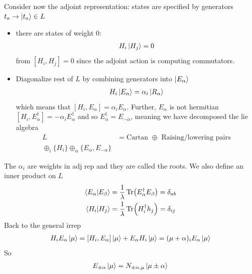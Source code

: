 \documentclass[a4paper,12pt]{article}
\begin{document}
Consider now the adjoint representation: states are specified by generators $t_a\to \ket{t_a}\in L$ 
\begin{itemize}
\item there are states of weight 0:
\begin{equation}
	\begin{aligned}
		H_i\ket{H_j}=0
	\end{aligned}
\end{equation}
from $[H_i,H_j]=0$ since the adjoint action is computing commutators.
\item Diagonalize rest of $L$ by combining generators into $\ket{E_\alpha}$
\begin{equation}
	\begin{aligned}
		H_i\ket{E_\alpha}=\alpha_i\ket{R_\alpha}
	\end{aligned}
\end{equation}
which means that $[H_i,E_\alpha]=\alpha_i E_\alpha$. Further, $E_\alpha$ is not hermitian  $[H_i,E_\alpha^\dagger]=-\alpha_i E_\alpha^\dagger$ and so $E_\alpha^\dagger=E_{-\alpha}$, meaning we have decomposed the lie algebra
\begin{equation}
	\begin{aligned}
		L&= \text{Cartan } \oplus \text{ Raising/lowering pairs}\\
		\oplus_{i}\{H_i\}\oplus_\alpha \{E_\alpha,E_{-\alpha}\}
	\end{aligned}
\end{equation}
\end{itemize}
The $\alpha_i$ are weights in adj rep and they are called the roots. We also define an inner product on $L$
\begin{equation}
	\begin{aligned}
		\braket{E_\alpha}{E_\beta}&=\frac{1}{\lambda}\Tr(E_\alpha^\dagger E_\beta)=\delta_{ab}\\
		\braket{H_i}{H_j}&=\frac{1}{\lambda}\Tr(H_i^\dagger h_j)=\delta_{ij}\\
	\end{aligned}
\end{equation}
Back to the general irrep
\begin{equation}
	\begin{aligned}
		H_i E_\alpha\ket{\mu}=[H_i,E_\alpha]\ket{\mu}+E_\alpha H_i\ket{\mu}=(\mu+\alpha)_i E_\alpha\ket{\mu}
	\end{aligned}
\end{equation}
So
\begin{equation}
	\begin{aligned}
		E_{\pm \alpha}\ket{\mu}=N_{\pm\alpha,\mu}\ket{\mu\pm\alpha}
	\end{aligned}
\end{equation}
\end{document}
